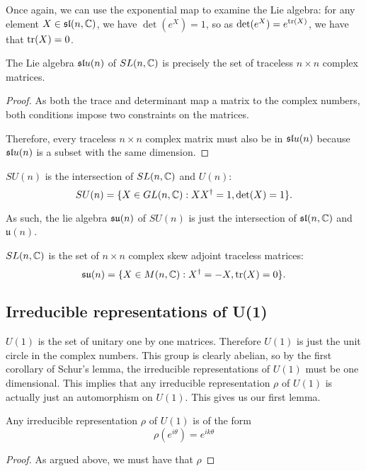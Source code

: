 \documentclass[a4paper]{article}
\begin{document}
Once again, we can use the exponential map to examine the Lie algebra: for any element $X \in \sl(n, \C)$, we have $\det(e^X) = 1$, so as $\det(e^X) = e^{\tr(X)}$, we have that $\tr(X) = 0$. 

\begin{prop}
    The Lie algebra $\sl{u}(n)$ of $SL(n, \C)$ is precisely the set of traceless $n \times n$ complex matrices. 
\end{prop}

\begin{proof}
    As both the trace and determinant map a matrix to the complex numbers, both conditions impose two constraints on the matrices. 
    
    Therefore, every traceless $n \times n$ complex matrix must also be in $\sl{u}(n)$ because $\sl{u}(n)$ is a subset with the same dimension.
\end{proof}

\begin{defi}[$SU(n)$]
    $SU(n)$ is the intersection of $SL(n, \C)$ and $U(n)$:
    $$SU(n) = \{X \in GL(n, \C) : XX^\dagger = 1, \det(X) = 1\}.$$
\end{defi}

As such, the lie algebra $\su(n)$ of $SU(n)$ is just the intersection of $\sl(n, \C)$ and $\mathfrak{u}(n)$. 

\begin{prop}
    $SL(n, \C)$ is the set of $n \times n$ complex skew adjoint traceless matrices: $$\su(n) = \{X \in M(n, \C) : X^\dagger = -X, \tr(X) = 0\}.$$
\end{prop}

\subsection{Irreducible representations of U(1)}
$U(1)$ is the set of unitary one by one matrices. Therefore $U(1)$ is just the unit circle in the complex numbers. This group is clearly abelian, so by the first corollary of Schur's lemma, the irreducible representations of $U(1)$ must be one dimensional. This implies that any irreducible representation $\rho$ of $U(1)$ is actually just an automorphism on $U(1)$. This gives us our first lemma.

\begin{lemma}
    Any irreducible representation $\rho$ of $U(1)$ is of the form $$\rho(e^{i\theta}) = e^{ik\theta}$$
\end{lemma}

\begin{proof}
    As argued above, we must have that $\rho$
\end{proof}
\end{document}
